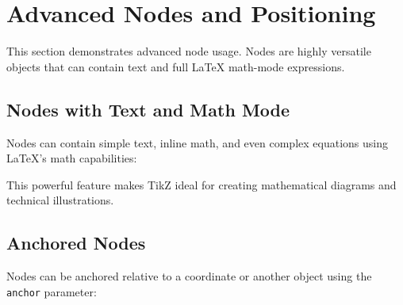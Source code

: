 \documentclass{article}
\begin{document}
\section{Advanced Nodes and Positioning}
This section demonstrates advanced node usage. Nodes are highly versatile objects that can contain text and full \LaTeX{} math-mode expressions.

\subsection{Nodes with Text and Math Mode}
Nodes can contain simple text, inline math, and even complex equations using \LaTeX's math capabilities:

\begin{center}
\end{center}

This powerful feature makes TikZ ideal for creating mathematical diagrams and technical illustrations.

\subsection{Anchored Nodes}
Nodes can be anchored relative to a coordinate or another object using the \texttt{anchor} parameter:

\begin{center}
\end{center}
\end{document}
